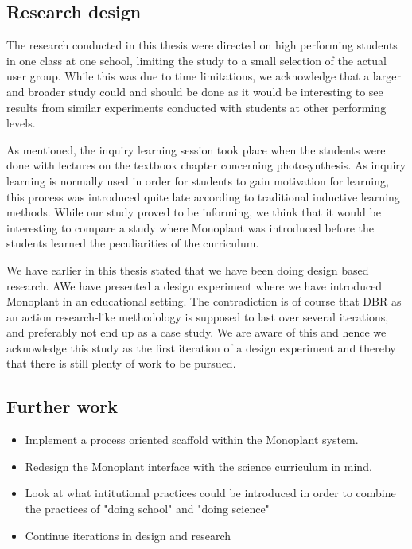 \subsection{Research design}
The research conducted in this thesis were directed on high performing students in one class at one school, limiting the study to a small selection of the actual user group. While this was due to time limitations, we acknowledge that a larger and broader study could and should be done as it would be interesting to see results from similar experiments conducted with students at other performing levels.

As mentioned, the inquiry learning session took place when the students were done with lectures on the textbook chapter concerning photosynthesis. As inquiry learning is normally used in order for students to gain motivation for learning, this process was introduced quite late according to traditional inductive learning methods. While our study proved to be informing, we think that it would be interesting to compare a study where Monoplant was introduced before the students learned the peculiarities of the curriculum.

We have earlier in this thesis stated that we have been doing design based research. AWe have presented a design experiment where we have introduced Monoplant in an educational setting. The contradiction is of course that DBR as an action research-like methodology is supposed to last over several iterations, and preferably not end up as a case study. We are aware of this and hence we acknowledge this study as the first iteration of a design experiment and thereby that there is still plenty of work to be pursued.

\subsection{Further work}

\begin{itemize}
\item{Implement a process oriented scaffold within the Monoplant system.}
\item{Redesign the Monoplant interface with the science curriculum in mind.}
\item{Look at what intitutional practices could be introduced in order to combine the practices of "doing school" and "doing science"}
\item{Continue iterations in design and research}
\end{itemize}